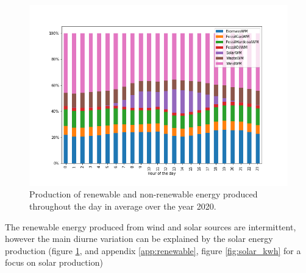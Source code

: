 \documentclass[11pt]{article} %
\begin{document}
\begin{figure}
  \includegraphics[width=0.9\linewidth]{../outputs/generated_energy_precent_per_sources.png}
  \caption{Production of renewable and non-renewable energy produced throughout the day in average over the year 2020.}
  \label{fig:per_source}
\end{figure}

The renewable energy produced from wind and solar sources are intermittent, however the main diurne variation can be explained by the solar energy production (figure \ref{fig:per_source}, and appendix \ref{app:renewable}, figure \ref{fig:solar_kwh} for a focus on solar production)
\end{document}
